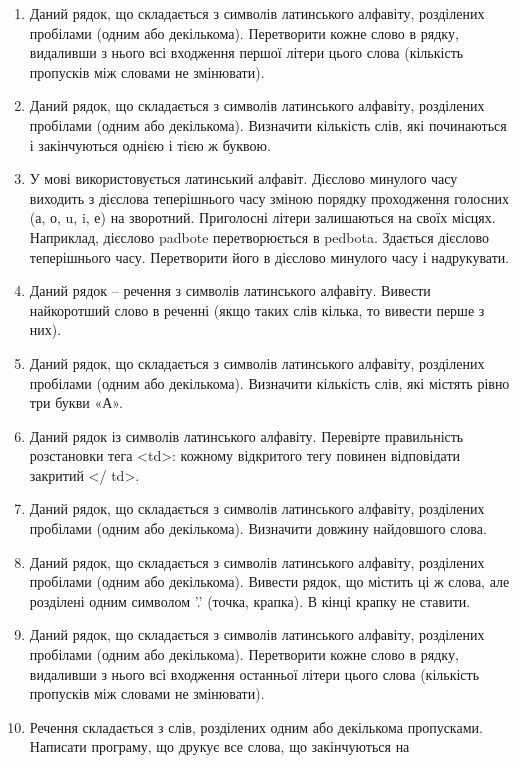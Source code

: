 \documentclass[]{article}
\begin{document}
\begin{enumerate}
\def\labelenumi{\arabic{enumi})}
\item
  Даний рядок, що складається з символів латинського алфавіту,
  розділених пробілами (одним або декількома). Перетворити кожне слово в
  рядку, видаливши з нього всі входження першої літери цього слова
  (кількість пропусків між словами не змінювати).
\item
  Даний рядок, що складається з символів латинського алфавіту,
  розділених пробілами (одним або декількома). Визначити кількість слів,
  які починаються і закінчуються однією і тією ж буквою.
\item
  У мові використовується латинський алфавіт. Дієслово минулого часу
  виходить з дієслова теперішнього часу зміною порядку проходження
  голосних (а, о, u, i, е) на зворотний. Приголосні літери залишаються
  на своїх місцях. Наприклад, дієслово padbote перетворюється в pedbota.
  Здається дієслово теперішнього часу. Перетворити його в дієслово
  минулого часу і надрукувати.
\item
  Даний рядок -- речення з символів латинського алфавіту. Вивести
  найкоротший слово в реченні (якщо таких слів кілька, то вивести перше
  з них).
\item
  Даний рядок, що складається з символів латинського алфавіту,
  розділених пробілами (одним або декількома). Визначити кількість слів,
  які містять рівно три букви «А».
\item
  Даний рядок із символів латинського алфавіту. Перевірте правильність
  розстановки тега \textless{}td\textgreater{}: кожному відкритого тегу
  повинен відповідати закритий \textless{}/ td\textgreater{}.
\item
  Даний рядок, що складається з символів латинського алфавіту,
  розділених пробілами (одним або декількома). Визначити довжину
  найдовшого слова.
\item
  Даний рядок, що складається з символів латинського алфавіту,
  розділених пробілами (одним або декількома). Вивести рядок, що містить
  ці ж слова, але розділені одним символом '.' (точка, крапка). В кінці
  крапку не ставити.
\item
  Даний рядок, що складається з символів латинського алфавіту,
  розділених пробілами (одним або декількома). Перетворити кожне слово в
  рядку, видаливши з нього всі входження останньої літери цього слова
  (кількість пропусків між словами не змінювати).
\item
  Речення складається з слів, розділених одним або декількома
  пропусками. Написати програму, що друкує все слова, що закінчуються на

\end{enumerate}
\end{document}
